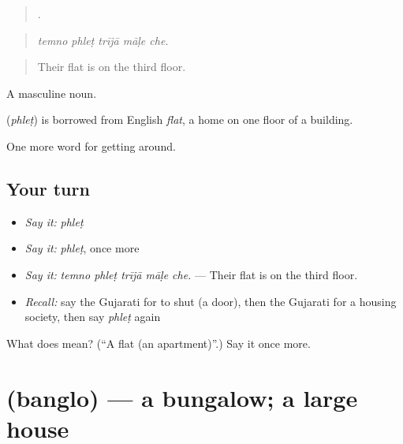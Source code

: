 \begin{quote}
    .
\end{quote}

\begin{quote}
\emph{temno phleṭ trījā māḷe che.}
\end{quote}

\begin{quote}
Their flat is on the third floor.
\end{quote}

A masculine noun.

\begin{cousinweb}
\textbf{} (\emph{phleṭ}) is borrowed from English \emph{flat}, a home on one floor of a building.
\end{cousinweb}

\begin{grammarlens}[title={What you've built}]
One more word for getting around.
\end{grammarlens}

\subsection*{Your turn}
\begin{itemize}
\raggedright
  \item \emph{Say it:} \emph{phleṭ}
  \item \emph{Say it:} \emph{phleṭ}, once more
  \item \emph{Say it:} \emph{temno phleṭ trījā māḷe che.} — Their flat is on the third floor.
  \item \emph{Recall:} say the Gujarati for to shut (a door), then the Gujarati for a housing society, then say \emph{phleṭ} again
\end{itemize}

\begin{tcolorbox}[breakable,colback=teal!4,colframe=teal!35!black,title={Before you move on}]
What does  mean? (\textquotedblleft{}A flat (an apartment)\textquotedblright{}.) Say it once more.
\end{tcolorbox}
\section[\texorpdfstring{\gu{બંગલો} (banglo)}{બંગલો (banglo)}]{ (banglo) — a bungalow; a large house}

\label{lesson:GU-C418-banglo}



